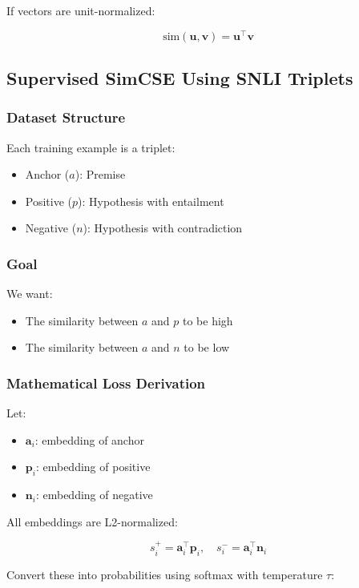 If vectors are unit-normalized:

\[
\text{sim}(\mathbf{u}, \mathbf{v}) = \mathbf{u}^\top \mathbf{v}
\]

\subsection{Supervised SimCSE Using SNLI Triplets}

\subsubsection{Dataset Structure}

Each training example is a triplet:
\begin{itemize}
    \item Anchor ($a$): Premise
    \item Positive ($p$): Hypothesis with entailment
    \item Negative ($n$): Hypothesis with contradiction
\end{itemize}

\subsubsection{Goal}

We want:
\begin{itemize}
    \item The similarity between $a$ and $p$ to be high
    \item The similarity between $a$ and $n$ to be low
\end{itemize}

\subsubsection{Mathematical Loss Derivation}

Let:
\begin{itemize}
    \item $\mathbf{a}_i$: embedding of anchor
    \item $\mathbf{p}_i$: embedding of positive
    \item $\mathbf{n}_i$: embedding of negative
\end{itemize}

All embeddings are L2-normalized:

\[
s^+_i = \mathbf{a}_i^\top \mathbf{p}_i, \quad s^-_i = \mathbf{a}_i^\top \mathbf{n}_i
\]

Convert these into probabilities using softmax with temperature $\tau$:

